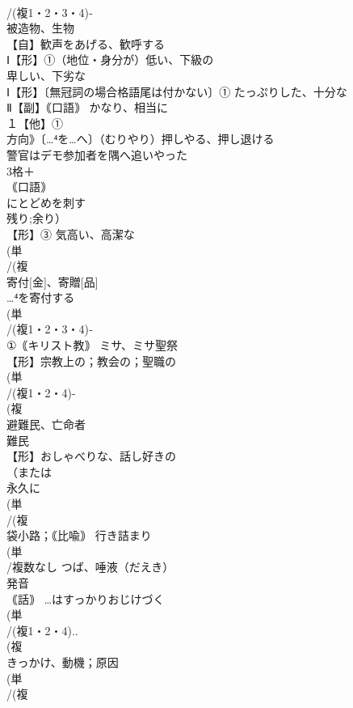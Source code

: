 \documentclass[8pt]{extreport}
\begin{document}
\begin{CJK}{UTF8}{min}
\\	/(複1・2・3・4)‐
\\	被造物、生物 
\\	【自】歓声をあげる、歓呼する
\\	Ⅰ【形】①（地位・身分が）低い、下級の 
\\	卑しい、下劣な
\\	Ⅰ【形】〔無冠詞の場合格語尾は付かない〕① たっぷりした、十分な 
\\	Ⅱ【副】｟口語｠ かなり、相当に
\\	１【他】①
\\	方向》〔…⁴を…へ〕（むりやり）押しやる、押し退ける 
\\	警官はデモ参加者を隅へ追いやった
\\	3格＋
\\	｟口語｠ 
\\	にとどめを刺す 
\\	残り;余り）
\\	【形】③ 気高い、高潔な
\\	(単
\\	/(複
\\	寄付[金]、寄贈[品] 
\\	…⁴を寄付する
\\	(単
\\	/(複1・2・3・4)‐
\\	①｟キリスト教｠ ミサ、ミサ聖祭 
\\	【形】宗教上の；教会の；聖職の 
\\	(単
\\	/(複1・2・4)-
\\	(複
\\	避難民、亡命者 
\\	難民 
\\	【形】おしゃべりな、話し好きの 
\\	（または
\\	永久に
\\	(単
\\	/(複
\\	袋小路；｟比喩｠ 行き詰まり 
\\	(単
\\	/複数なし つば、唾液（だえき） 
\\	発音
\\	｟話｠ …はすっかりおじけづく
\\	(単
\\	/(複1・2・4)..
\\	(複
\\	きっかけ、動機；原因
\\	(単
\\	/(複

\end{CJK}
\end{document}

